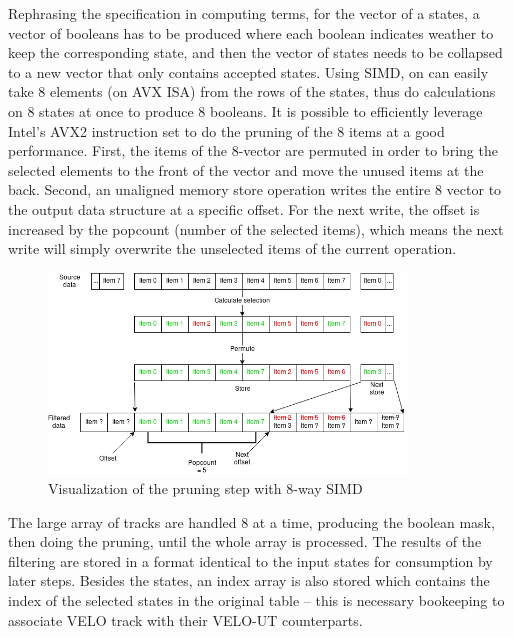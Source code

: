 \documentclass[12pt]{article}
\begin{document}
Rephrasing the specification in computing terms, for the vector of a states, a vector of booleans has to be produced where each boolean indicates weather to keep the corresponding state, and then the vector of states needs to be collapsed to a new vector that only contains accepted states. Using SIMD, on can easily take 8 elements (on AVX ISA) from the rows of the states, thus do calculations on 8 states at once to produce 8 booleans. It is possible to efficiently leverage Intel's AVX2 instruction set to do the pruning of the 8 items at a good performance\cite{lemire_simd_prune}. First, the items of the 8-vector are permuted in order to bring the selected elements to the front of the vector and move the unused items at the back. Second, an unaligned memory store operation writes the entire 8 vector to the output data structure at a specific offset. For the next write, the offset is increased by the popcount (number of the selected items), which means the next write will simply overwrite the unselected items of the current operation.

\begin{figure}[H]
	\begin{center}
		\includegraphics[width=0.85\textwidth]{velout_opt_simd_filter}
	\end{center}
	\caption{Visualization of the pruning step with 8-way SIMD}
	\label{fig_velout_opt_simd_filter}
\end{figure}

The large array of tracks are handled 8 at a time, producing the boolean mask, then doing the pruning, until the whole array is processed. The results of the filtering are stored in a format identical to the input states for consumption by later steps. Besides the states, an index array is also stored which contains the index of the selected states in the original table -- this is necessary bookeeping to associate VELO track with their VELO-UT counterparts.
\end{document}
